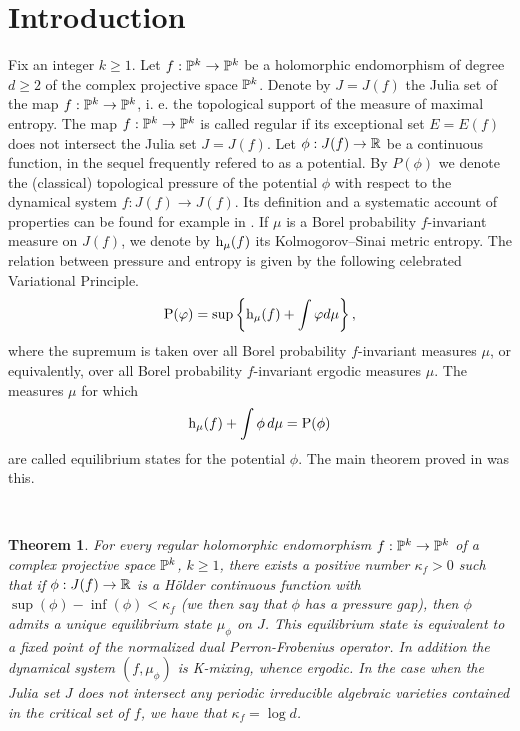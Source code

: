 \documentclass[12pt]{amsart}
\numberwithin{equation}{section}
\newcommand{\bthm}{\begin{thm}}
\newcommand{\ethm}{\end{thm}}
\newcommand{\nl}{\newline}
\newtheorem{thm}{Theorem}[section]
\def\h{{\text h}}
\def\hmu{\h_\mu}           \def\htop{{\text h_{\text{top}}}}
\def\ka{\kappa}
\def\lt{\left}                \def\rt{\right}
\def\sp{\medskip}             \def\fr{\noindent}        \def\nl{\newline}
\begin{document}
\maketitle

\section{Introduction}

\sp\fr Fix an integer $k\ge 1$. Let $f:{\mathbb P}^k\to{\mathbb P}^k$ be a holomorphic
endomorphism of degree $d\ge 2$ of the complex projective space ${\mathbb P}^k$.
Denote by $J=J(f)$ the Julia set of the map $f:{\mathbb P}^k\to{\mathbb P}^k$, i. e.
the topological support of the measure of maximal entropy. The map
$f:{\mathbb P}^k\to{\mathbb P}^k$ is called regular if its exceptional set $E=E(f)$ does
not intersect the Julia set $J=J(f)$. Let $\phi:J(f)\to{\mathbb R}$ be a
continuous function, in the 
sequel frequently refered to as a potential. By $P(\phi)$  
we denote the (classical) topological pressure of the potential $\phi$
with respect to the dynamical system $f:J(f)\to J(f)$. Its definition
and a systematic account of properties can be found for example in
\cite{PU}.  If $\mu$ is a Borel probability $f$-invariant measure on
$J(f)$, we denote by $\hmu(f)$ its Kolmogorov--Sinai metric entropy. The
relation between pressure and entropy is given by the following celebrated
Variational Principle.
\begin{equation}\label{VP}
\P(\varphi)=\sup\lt\{\hmu(f)+\int\varphi d\mu\rt\},
\end{equation}
where the supremum is taken over all Borel probability $f$-invariant
measures $\mu$, or equivalently, over all Borel probability
$f$-invariant ergodic measures $\mu$. The measures $\mu$ for which 
$$
\hmu(f)+\int\phi\, d\mu=\P(\phi)
$$ 
are called equilibrium states for the potential
$\phi$. The main theorem proved in \cite{uzpk} was this.

\

\bthm\label{AA}
For every  regular holomorphic endomorphism $f:{\mathbb P}^k\to{\mathbb P}^k$ of a complex
projective space ${\mathbb P}^k$, $k\ge 1$, there exists a positive number
$\ka_f>0$ such that if $\phi:J(f)\to{\mathbb R}$ is a H\"older continuous
function with $\sup(\phi)-\inf(\phi)<\ka_f$ (we then say that $\phi$
has a pressure gap), then $\phi$ admits a
unique equilibrium state $\mu_\phi$ on $J$. This equilibrium state is
equivalent to a fixed point of the normalized dual Perron-Frobenius
operator. In addition the
dynamical system $(f,\mu_\phi)$ is K-mixing, whence ergodic. In the
case when the Julia set $J$ does not intersect any periodic
irreducible algebraic varieties contained in the critical set of $f$,
we have that $\ka_f=\log d$.
\ethm
\end{document}
